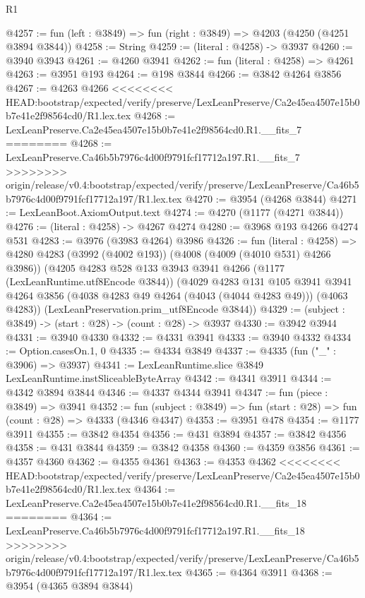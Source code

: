 \begin{lexlean}{R1}
\begin{coremodule}
{{{{{{{{{{{{{{{{{{{{{{{{{{{{{{{{{{{{{{{{{{{{{{{{{{{{{{{{{{{{{{{{{{{{{{{{{{{{{{{{{{{{{{{{{{{{{{{{{{{{{{{{{{{{{{{{{{{{{{{{{{{{{{{{{{{{{{{{{{{{{{{{{{{{{{{{{{{{{{{{{{{{{{{{{{{{{{{{{{{{{{{{{{@4257 := fun (left : @3849) => fun (right : @3849) => @4203 (@4250 (@4251 @3894 @3844))
@4258 := String
@4259 := (literal : @4258) -> @3937
@4260 := @3940 @3943
@4261 := @4260 @3941
@4262 := fun (literal : @4258) => @4261
@4263 := @3951 @193
@4264 := @198 @3844
@4266 := @3842 @4264 @3856
@4267 := @4263 @4266
<<<<<<<< HEAD:bootstrap/expected/verify/preserve/LexLeanPreserve/Ca2e45ea4507e15b0b7e41e2f98564cd0/R1.lex.tex
@4268 := LexLeanPreserve.Ca2e45ea4507e15b0b7e41e2f98564cd0.R1.__fits_7
========
@4268 := LexLeanPreserve.Ca46b5b7976c4d00f9791fcf17712a197.R1.__fits_7
>>>>>>>> origin/release/v0.4:bootstrap/expected/verify/preserve/LexLeanPreserve/Ca46b5b7976c4d00f9791fcf17712a197/R1.lex.tex
@4270 := @3954 (@4268 @3844)
@4271 := LexLeanBoot.AxiomOutput.text
@4274 := @4270 (@1177 (@4271 @3844))
@4276 := (literal : @4258) -> @4267 @4274
@4280 := @3968 @193 @4266 @4274 @531
@4283 := @3976 (@3983 @4264) @3986
@4326 := fun (literal : @4258) =>
  @4280
    @4283
    (@3992 (@4002 @193))
    (@4008 (@4009 (@4010 @531) @4266 @3986))
    (@4205
      @4283
      @528
      @133
      @3943
      @3941
      @4266
      (@1177 (LexLeanRuntime.utf8Encode @3844))
      (@4029
        @4283
        @131
        @105
        @3941
        @3941
        @4264
        @3856
        (@4038 @4283 @49 @4264 (@4043 (@4044 @4283 @49)))
        (@4063 @4283))
      (LexLeanPreservation.prim_utf8Encode @3844))
@4329 := (subject : @3849) -> (start : @28) -> (count : @28) -> @3937
@4330 := @3942 @3944
@4331 := @3940 @4330
@4332 := @4331 @3941
@4333 := @3940 @4332
@4334 := Option.casesOn.{1, 0}
@4335 := @4334 @3849
@4337 := @4335 (fun ("_" : @3906) => @3937)
@4341 := LexLeanRuntime.slice @3849 LexLeanRuntime.instSliceableByteArray
@4342 := @4341 @3911
@4344 := @4342 @3894 @3844
@4346 := @4337 @4344 @3941
@4347 := fun (piece : @3849) => @3941
@4352 := fun (subject : @3849) => fun (start : @28) => fun (count : @28) => @4333 (@4346 @4347)
@4353 := @3951 @478
@4354 := @1177 @3911
@4355 := @3842 @4354
@4356 := @431 @3894
@4357 := @3842 @4356
@4358 := @431 @3844
@4359 := @3842 @4358
@4360 := @4359 @3856
@4361 := @4357 @4360
@4362 := @4355 @4361
@4363 := @4353 @4362
<<<<<<<< HEAD:bootstrap/expected/verify/preserve/LexLeanPreserve/Ca2e45ea4507e15b0b7e41e2f98564cd0/R1.lex.tex
@4364 := LexLeanPreserve.Ca2e45ea4507e15b0b7e41e2f98564cd0.R1.__fits_18
========
@4364 := LexLeanPreserve.Ca46b5b7976c4d00f9791fcf17712a197.R1.__fits_18
>>>>>>>> origin/release/v0.4:bootstrap/expected/verify/preserve/LexLeanPreserve/Ca46b5b7976c4d00f9791fcf17712a197/R1.lex.tex
@4365 := @4364 @3911
@4368 := @3954 (@4365 @3894 @3844)
}}}}}}}}}}}}}}}}}}}}}}}}}}}}}}}}}}}}}}}}}}}}}}}}}}}}}}}}}}}}}}}}}}}}}}}}}}}}}}}}}}}}}}}}}}}}}}}}}}}}}}}}}}}}}}}}}}}}}}}}}}}}}}}}}}}}}}}}}}}}}}}}}}}}}}}}}}}}}}}}}}}}}}}}}}}}}}}}}}}}}}}}}}
\end{coremodule}
\end{lexlean}
